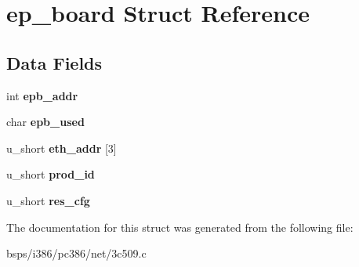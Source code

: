\hypertarget{structep__board}{}\section{ep\+\_\+board Struct Reference}
\label{structep__board}
\subsection*{Data Fields}
\begin{DoxyCompactItemize}
\item 
\mbox{\label{structep__board_a319f8cf11981613f0f571ac60f6dd483}} 
int {\bfseries epb\+\_\+addr}
\item 
\mbox{\label{structep__board_ac04067f433db147054ad40c0d040297c}} 
char {\bfseries epb\+\_\+used}
\item 
\mbox{\label{structep__board_a5711a9d9da32b8e7593a179bac33787d}} 
u\+\_\+short {\bfseries eth\+\_\+addr} \mbox{[}3\mbox{]}
\item 
\mbox{\label{structep__board_a5ec8d43d9260270e38442493420a0aff}} 
u\+\_\+short {\bfseries prod\+\_\+id}
\item 
\mbox{\label{structep__board_a7cc10cdbc6df42fe19917ad3df666f72}} 
u\+\_\+short {\bfseries res\+\_\+cfg}
\end{DoxyCompactItemize}


The documentation for this struct was generated from the following file\+:\begin{DoxyCompactItemize}
\item 
bsps/i386/pc386/net/3c509.\+c\end{DoxyCompactItemize}
